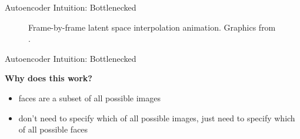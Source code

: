 \begin{frame}{Autoencoder Intuition: Bottlenecked}

\begin{figure}

\begin{columns}
\begin{column}{0.4\textwidth}
\caption{
Frame-by-frame latent space interpolation animation.
Graphics from \cite{white2016sampling}.
}
\end{column}
\end{columns}

\end{figure}

\end{frame}

\begin{frame}{Autoencoder Intuition: Bottlenecked}

\Large

\textbf{Why does this work?}

\pause

\begin{itemize}[<+->]
\pause
\item faces are a subset of all possible images
\pause
\item don't need to specify which of all possible images, just need to specify which of all possible faces
\end{itemize}

\end{frame}


